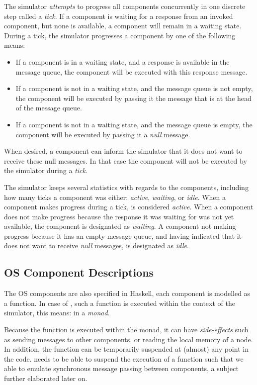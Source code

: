 The simulator \emph{attempts} to progress all components concurrently in one discrete step called a \emph{tick}.
If a component is waiting for a response from an invoked component, but none is available, a component will remain in a waiting state.
During a tick, the simulator progresses a component by one of the following means:
\begin{itemize}
  \item If a component is in a waiting state, and a response is available in the message queue, the component will be executed with this response message.
  \item If a component is not in a waiting state, and the message queue is not empty, the component will be executed by passing it the message that is at the head of the message queue.
  \item If a component is not in a waiting state, and the message queue is empty, the component will be executed by passing it a \emph{null} message.
\end{itemize}
When desired, a component can inform the simulator that it does not want to receive these null messages.
In that case the component will not be executed by the simulator during a \emph{tick}.

The simulator keeps several statistics with regards to the components, including how many ticks a component was either: \emph{active}, \emph{waiting}, or \emph{idle}.
When a component makes progress during a tick, is considered \emph{active}.
When a component does not make progress because the response it was waiting for was not yet available, the component is designated as \emph{waiting}.
A component not making progress because it has an empty message queue, and having indicated that it does not want to receive \emph{null} messages, is designated as \emph{idle}.

\subsection{OS Component Descriptions}
The OS components are also specified in Haskell, each component is modelled as a function.
In case of \soosim, such a function is executed within the context of the simulator, this means: in a \emph{monad}.

Because the function is executed within the monad, it can have \emph{side-effects} such as sending messages to other components, or reading the local memory of a node.
In addition, the function can be temporarily suspended at (almost) any point in the code.
\soosim needs to be able to suspend the execution of a function such that we able to emulate synchronous message passing between components, a subject further elaborated later on.

